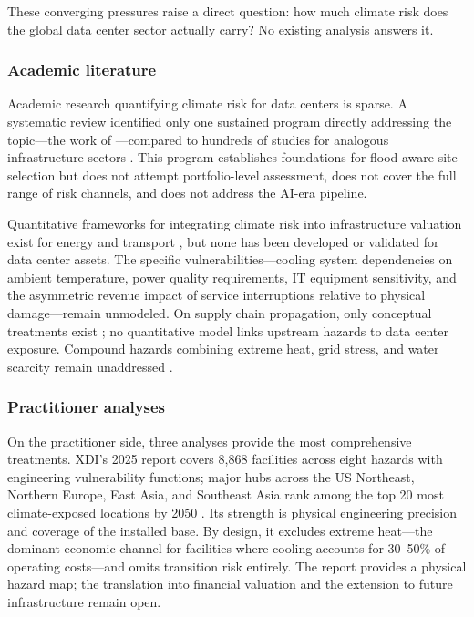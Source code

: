 \begin{twocolbody}

\noindent These converging pressures raise a direct question: how much climate risk does the global data center sector actually carry? No existing analysis answers it.

\subsubsection*{Academic literature}

Academic research quantifying climate risk for data centers is sparse. A systematic review identified only one sustained program directly addressing the topic---the work of \citet{pasupuleti2022, pasupuleti2024, pasupuleti2025}---compared to hundreds of studies for analogous infrastructure sectors \citep{forzieri2016, dawson2018, oughton2023, luo2023}. This program establishes foundations for flood-aware site selection but does not attempt portfolio-level assessment, does not cover the full range of risk channels, and does not address the AI-era pipeline.

Quantitative frameworks for integrating climate risk into infrastructure valuation exist for energy and transport \citep{in2020, in2021, in2022, prime2018, pasha2025}, but none has been developed or validated for data center assets. The specific vulnerabilities---cooling system dependencies on ambient temperature, power quality requirements, IT equipment sensitivity, and the asymmetric revenue impact of service interruptions relative to physical damage---remain unmodeled. On supply chain propagation, only conceptual treatments exist \citep{koks2022}; no quantitative model links upstream hazards to data center exposure. Compound hazards combining extreme heat, grid stress, and water scarcity remain unaddressed \citep{karagiannakis2024}.

\subsubsection*{Practitioner analyses}

On the practitioner side, three analyses provide the most comprehensive treatments. XDI's 2025 report \citep{xdi2025} covers 8{,}868 facilities across eight hazards with engineering vulnerability functions; major hubs across the US Northeast, Northern Europe, East Asia, and Southeast Asia rank among the top 20 most climate-exposed locations by 2050 \citep{xdi2025, dcd2025}. Its strength is physical engineering precision and coverage of the installed base. By design, it excludes extreme heat---the dominant economic channel for facilities where cooling accounts for 30--50\% of operating costs---and omits transition risk entirely. The report provides a physical hazard map; the translation into financial valuation and the extension to future infrastructure remain open.


\end{twocolbody}
